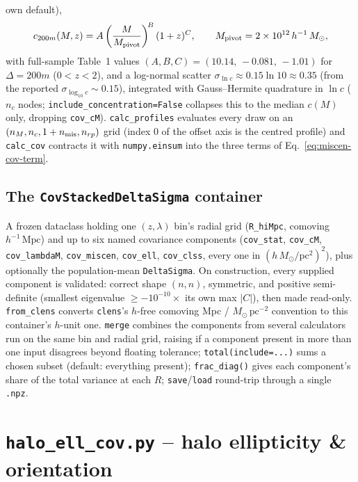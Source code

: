 \documentclass[a4paper, 11pt]{article}
\newcommand{\hMpc}{h^{-1}\,\mathrm{Mpc}}
\newcommand{\hMsun}{h^{-1}\,M_{\odot}}
\newcommand{\modname}[1]{\textcolor{kwcol}{\texttt{#1}}}
\newcommand{\pyfile}[1]{{\small\texttt{#1}}}
\begin{document}
own default),
\begin{equation}
  c_{200m}(M,z) = A\left(\frac{M}{M_{\rm pivot}}\right)^{\!B}(1+z)^C,
  \qquad M_{\rm pivot} = 2\times10^{12}\,\hMsun,
\end{equation}
with full-sample Table~1 values $(A,B,C) = (10.14,\,-0.081,\,-1.01)$
for $\Delta=200m$ ($0<z<2$), and a log-normal scatter
$\sigma_{\ln c}\approx 0.15\ln 10\approx 0.35$ (from the reported
$\sigma_{\log_{10}c}\sim 0.15$), integrated with Gauss--Hermite
quadrature in $\ln c$ ($n_c$ nodes; \texttt{include\_concentration=False}
collapses this to the median $c(M)$ only, dropping \texttt{cov\_cM}).
\texttt{calc\_profiles} evaluates every draw on an $(n_M, n_c, 1+n_{\rm
mis}, n_{rp})$ grid (index 0 of the offset axis is the centred
profile) and \texttt{calc\_cov} contracts it with
\texttt{numpy.einsum} into the three terms of
Eq.~\eqref{eq:miscen-cov-term}.

\subsection{The \texttt{CovStackedDeltaSigma} container}
\label{sec:container}

A frozen dataclass holding one $(z,\lambda)$ bin's radial grid
(\texttt{R\_hiMpc}, comoving $\hMpc$) and up to six named covariance
components (\texttt{cov\_stat}, \texttt{cov\_cM},
\texttt{cov\_lambdaM}, \texttt{cov\_miscen}, \texttt{cov\_ell},
\texttt{cov\_clss}, every one in $(h\,M_\odot/\mathrm{pc}^2)^2$),
plus optionally the population-mean \texttt{DeltaSigma}. On
construction, every supplied component is validated: correct shape
$(n,n)$, symmetric, and positive semi-definite (smallest eigenvalue
$\ge -10^{-10}\times$ its own max $|C|$), then made read-only.
\texttt{from\_clens} converts \modname{clens}'s $h$-free comoving
Mpc / $M_\odot\,\mathrm{pc}^{-2}$ convention to this container's
$h$-unit one. \texttt{merge} combines the components from several
calculators run on the same bin and radial grid, raising if a
component present in more than one input disagrees beyond floating
tolerance; \texttt{total(include=...)} sums a chosen subset (default:
everything present); \texttt{frac\_diag()} gives each component's
share of the total variance at each $R$; \texttt{save}/\texttt{load}
round-trip through a single \texttt{.npz}.

\section{\pyfile{halo\_ell\_cov.py} -- halo ellipticity \& orientation}
\label{sec:halo-ell}
\end{document}
